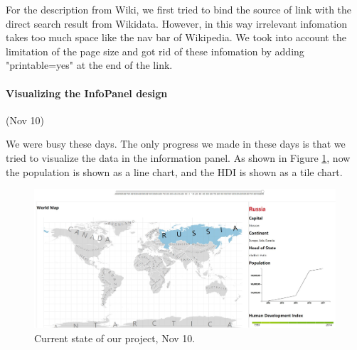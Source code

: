 \documentclass[12pt, fullpage,letterpaper]{article}
\begin{document}
For the description from Wiki, we first tried to bind the source of link with the direct search result from Wikidata.
However, in this way irrelevant infomation takes too much space like the nav bar of Wikipedia. 
We took into account the limitation of the page size and got rid of these infomation by adding "printable=yes" at the end of the link.

\newpage
\paragraph{Visualizing the InfoPanel design} (Nov 10)

We were busy these days. The only progress we made in these days is that we tried to visualize the data
in the information panel. As shown in Figure \ref{fig:nov10}, now the population is shown as a line chart,
and the HDI is shown as a tile chart.

\begin{figure}[h!]
    \begin{center}
        \includegraphics[width=\textwidth]{figs/Nov10.jpg}
        \caption{Current state of our project, Nov 10.}
        \label{fig:nov10}
    \end{center}
\end{figure}
\end{document}
